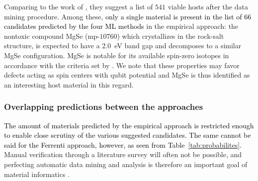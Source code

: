 \documentclass[superscriptaddress,unsortedaddress,
 amsmath,amssymb,
 aps,
]{revtex4-2}
\newcommand{\mrk}[1]{\textcolor{black}{#1}}
\begin{document}
Comparing to the work of \citeauthor{Ferrenti2020} \cite{Ferrenti2020}, they suggest a list of $541$ viable hosts after the data mining procedure.  
Among these, \mrk{only a single material is present in the list of $66$ candidates predicted by the four ML methods} in the empirical approach: the nontoxic compound MgSe (mp-$10760$) which crystallizes in the rock-salt structure, is expected to have a \SI{2.0}{\electronvolt} band gap and decomposes to a similar MgSe configuration. 
MgSe is notable for its available spin-zero isotopes in accordance with the criteria set by \citeauthor{Weber2010} \cite{Weber2010}\mrk{.}  
We note that these properties may favor defects acting as spin centers with qubit potential and MgSe is thus identified as an interesting host material in this regard.   

\subsubsection*{Overlapping predictions between the approaches}

\mrk{The amount of materials predicted by the empirical approach is restricted enough to enable close scrutiny of the various suggested candidates. The same cannot be said for the Ferrenti approach, however, as seen from Table~\ref{tab:probabilites}.} Manual verification through a literature survey will often not be possible\mrk{,} and perfecting automatic data mining and analysis is therefore an important goal of material informatics \cite{rickman2019}. 
\end{document}
